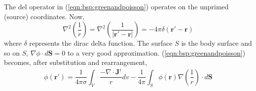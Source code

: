 The del operator in (\ref{eqn:bsp:greenandpoisson}) operates on the unprimed (source) coordinates.
Now,
\begin{equation}
\label{eqn:bsp:oneoverr}
\nabla^{2}\left(\frac{1}{r}\right) =
\nabla^{2}\left(\frac{1}{|\mathbf{r'}-\mathbf{r}|}\right) =
-4\pi\delta\left(\mathbf{r'}-\mathbf{r}\right)
\end{equation}
where $\delta$ represents the dirac delta function.  The surface $S$ is the body
surface and so on $S$, $\nabla\phi \cdot d\mathbf{S} = 0$ to a very good
approximation.  (\ref{eqn:bsp:greenandpoisson}) becomes, after substitution and
rearrangement,
\begin{equation}
\label{eqn:bsp:substituted}
\phi\left(\mathbf{r'}\right) =
\frac{1}{4 \pi \sigma}\int_{V} \frac{-\nabla \cdot \mathbf{J}^{i}}{r}dv - 
\frac{1}{4 \pi}\int_{S} \phi\left(\mathbf{r}\right)
\nabla\left(\frac{1}{r}\right) \cdot d\mathbf{S}
\end{equation}

